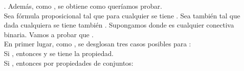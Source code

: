 \begin{isabellebody}
\begin{isamarkuptext}
\begin{demostracion}
    . Además, como , se obtiene
     como queríamos probar.\\
    Sea  fórmula proposicional tal que para cualquier  se tiene 
    . Sea también  tal que dada  cualquiera se 
    tiene también . Supongamos  donde \isa{{\isacharasterisk}} es 
    cualquier conectiva binaria. Vamos a probar que .\\
    En primer lugar, como , se desglosan tres
    casos posibles para :\\
    Si , entonces  y se tiene la propiedad.\\
    Si , entonces por propiedades de conjuntos:

\end{demostracion}
\end{isamarkuptext}
\end{isabellebody}

